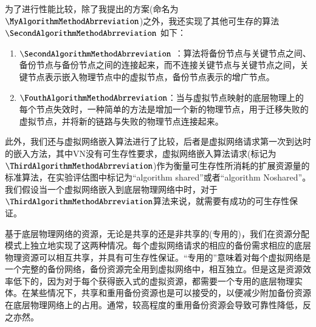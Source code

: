 
为了进行性能比较，除了我提出的方案(命名为$\MyAlgorithmMethodAbrreviation$)之外，我还实现了其他可生存的算法$\SecondAlgorithmMethodAbrreviation$  \cite{yeow2010designing}如下：
\begin{enumerate}
  \item $\SecondAlgorithmMethodAbrreviation$\cite{yeow2010designing} ：算法将备份节点与关键节点之间、备份节点与备份节点之间的连接起来，而不连接关键节点与关键节点之间，关键节点表示嵌入物理节点中的虚拟节点，备份节点表示的增广节点。
  \item $\FouthAlgorithmMethodAbrreviation$：当与虚拟节点映射的底层物理上的每个节点失效时，一种简单的方法是增加一个新的物理节点，用于迁移失败的虚拟节点，并将新的链路与失败的物理节点连接起来。
\end{enumerate}

此外，我们还与虚拟网络嵌入算法\cite{liu2011completing}进行了比较，后者是虚拟网络请求第一次到达时的嵌入方法，其中VN没有可生存性要求，虚拟网络嵌入算法请求(标记为$\ThirdAlgorithmMethodAbrreviation$)作为衡量可生存性所消耗的扩展资源量的标准算法，在实验评估图中标记为“algorithm shared”或者“algorithm Noshared”。 我们假设当一个虚拟网络嵌入到底层物理网络中时，对于$\ThirdAlgorithmMethodAbrreviation$算法来说，就需要有成功的可生存性保证。

基于底层物理网络的资源，无论是共享的还是非共享的(专用的)\cite{lu2006efficient}，我们在资源分配模式上独立地实现了这两种情况。每个虚拟网络请求的相应的备份需求相应的底层物理资源可以相互共享，并具有可生存性保证。“专用的”意味着对每个虚拟网络是一个完整的备份网络，备份资源完全用到虚拟网络中，相互独立。但是这是资源效率低下的，因为对于每个获得嵌入式的虚拟资源，都需要一个专用的底层物理实体。在某些情况下，共享和重用备份资源也是可以接受的，以便减少附加备份资源在底层物理网络上的占用。通常，较高程度的重用备份资源会导致可靠性降低，反之亦然。

